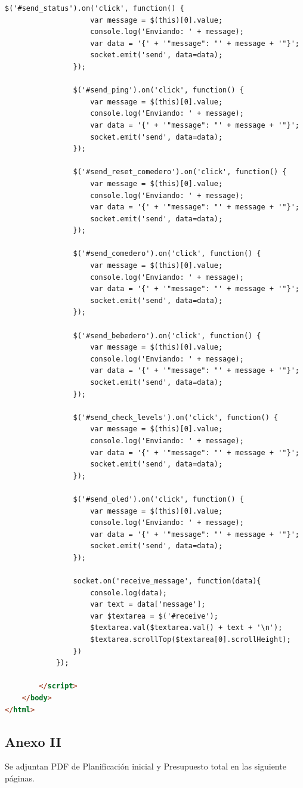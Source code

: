 \documentclass[12pt]{article}
\begin{document}
\begin{lstlisting}[language=html]
				$('#send_status').on('click', function() {
					var message = $(this)[0].value;
					console.log('Enviando: ' + message);
					var data = '{' + '"message": "' + message + '"}';
					socket.emit('send', data=data);
				});
					
				$('#send_ping').on('click', function() {
					var message = $(this)[0].value;
					console.log('Enviando: ' + message);
					var data = '{' + '"message": "' + message + '"}';
					socket.emit('send', data=data);
				});
					
				$('#send_reset_comedero').on('click', function() {
					var message = $(this)[0].value;
					console.log('Enviando: ' + message);
					var data = '{' + '"message": "' + message + '"}';
					socket.emit('send', data=data);
				});
					
				$('#send_comedero').on('click', function() {
					var message = $(this)[0].value;
					console.log('Enviando: ' + message);
					var data = '{' + '"message": "' + message + '"}';
					socket.emit('send', data=data);
				});
					
				$('#send_bebedero').on('click', function() {
					var message = $(this)[0].value;
					console.log('Enviando: ' + message);
					var data = '{' + '"message": "' + message + '"}';
					socket.emit('send', data=data);
				});
					
				$('#send_check_levels').on('click', function() {
					var message = $(this)[0].value;
					console.log('Enviando: ' + message);
					var data = '{' + '"message": "' + message + '"}';
					socket.emit('send', data=data);
				});
					
				$('#send_oled').on('click', function() {
					var message = $(this)[0].value;
					console.log('Enviando: ' + message);
					var data = '{' + '"message": "' + message + '"}';
					socket.emit('send', data=data);
				});
					
				socket.on('receive_message', function(data){
					console.log(data);
					var text = data['message'];
					var $textarea = $('#receive');
					$textarea.val($textarea.val() + text + '\n');
					$textarea.scrollTop($textarea[0].scrollHeight);
				})
			});
				
		</script>
	</body>
</html>
	\end{lstlisting}
		
	\pagebreak
	
	\subsection*{Anexo II}
	\label{anexo II: presupuesto}
	
	\noindent Se adjuntan PDF de Planificación inicial y Presupuesto total en las siguiente páginas.
	
	\pagebreak
	
\end{document}
